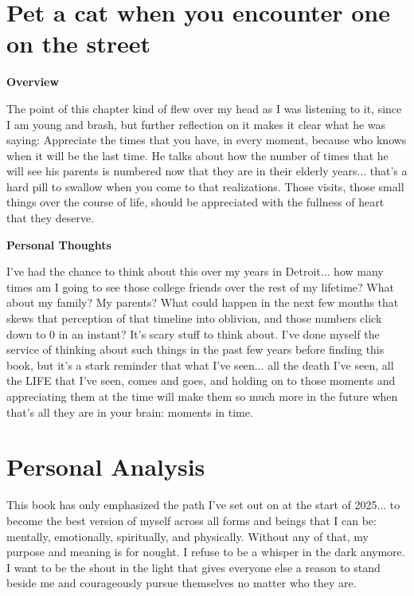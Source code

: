 \documentclass{article}
\begin{document}
\section{Pet a cat when you encounter one on the street}
        \begin{multicols}{2}
        \begin{center}
        \textbf{Overview}
        \end{center}
        
        The point of this chapter kind of flew over my head as I was listening to it, since I am young and brash, but further reflection on it makes it clear what he was saying: Appreciate the times that you have, in every moment, because who knows when it will be the last time. He talks about how the number of times that he will see his parents is numbered now that they are in their elderly years... that's a hard pill to swallow when you come to that realizations. Those visits, those small things over the course of life, should be appreciated with the fullness of heart that they deserve.

        \begin{center}
            \textbf{Personal Thoughts}
        \end{center}
        
        I've had the chance to think about this over my years in Detroit... how many times am I going to see those college friends over the rest of my lifetime? What about my family? My parents? What could happen in the next few months that skews that perception of that timeline into oblivion, and those numbers click down to 0 in an instant? It's scary stuff to think about. I've done myself the service of thinking about such things in the past few years before finding this book, but it's a stark reminder that what I've seen... all the death I've seen, all the LIFE that I've seen, comes and goes, and holding on to those moments and appreciating them at the time will make them so much more in the future when that's all they are in your brain: moments in time.
    \end{multicols}
\section{Personal Analysis}

This book has only emphasized the path I've set out on at the start of 2025... to become the best version of myself across all forms and beings that I can be: mentally, emotionally, spiritually, and physically. Without any of that, my purpose and meaning is for nought. I refuse to be a whisper in the dark anymore. I want to be the shout in the light that gives everyone else a reason to stand beside me and courageously pursue themselves no matter who they are.
\end{document}
